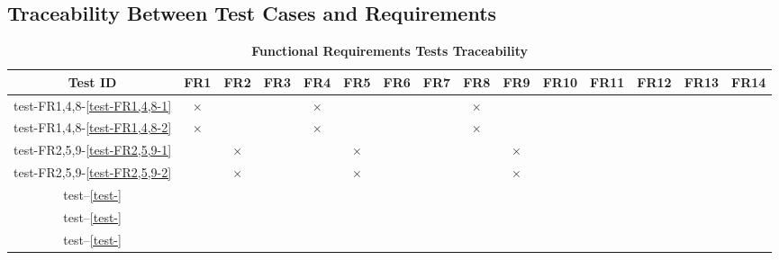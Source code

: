 \documentclass[12pt, titlepage]{article}
\begin{document}
\begin{landscape}
\subsection{Traceability Between Test Cases and Requirements} \label{section:4.4}

\begin{table}[H]
  \centering
  \begin{tabular}{|c|c|c|c|c|c|c|c|c|c|c|c|c|c|c|}
  \hline
   Test ID & FR1 & FR2 & FR3 & FR4 & FR5 & FR6 & FR7 & FR8 & FR9 & FR10 & FR11 & FR12 & FR13 & FR14\\
  \hline
  test-FR1,4,8-\ref{test-FR1,4,8-1} & $\times$ & & & $\times$ & & & & $\times$ & & & & & & \\
  \hline
  test-FR1,4,8-\ref{test-FR1,4,8-2} & $\times$ & & & $\times$ & & & & $\times$ & & & & & & \\
  \hline
  test-FR2,5,9-\ref{test-FR2,5,9-1} & & $\times$ & & & $\times$ & & & & $\times$ & & & & & \\
  \hline
  test-FR2,5,9-\ref{test-FR2,5,9-2} & & $\times$ & & & $\times$ & & & & $\times$ & & & & & \\
  \hline
  test--\ref{test-} & & & & & & & & & & & & & & \\
  \hline
  test--\ref{test-} & & & & & & & & & & & & & & \\
  \hline
  test--\ref{test-} & & & & & & & & & & & & & & \\
  \hline
\end{tabular}
\caption{\bf Functional Requirements Tests Traceability} \label{tab:fr-test-traceability}
\end{table}



\end{landscape}
\end{document}
